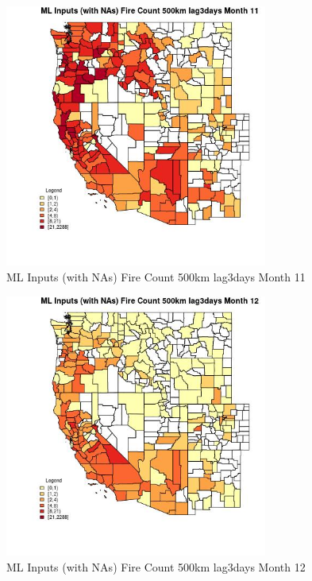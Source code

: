 \clearpage 

\begin{figure} 
\centering  
\includegraphics[width=0.77\textwidth]{Code_Outputs/Report_ML_input_PM25_Step4_part_e_de_duplicated_aves_compiled_2019-05-21wNAs_CountyFire_Count_500km_lag3daysmedianMonth11.jpg} 
\caption{\label{fig:Report_ML_input_PM25_Step4_part_e_de_duplicated_aves_compiled_2019-05-21wNAsCountyFire_Count_500km_lag3daysmedianMonth11}ML Inputs (with NAs) Fire Count 500km lag3days Month 11} 
\end{figure} 
 

\begin{figure} 
\centering  
\includegraphics[width=0.77\textwidth]{Code_Outputs/Report_ML_input_PM25_Step4_part_e_de_duplicated_aves_compiled_2019-05-21wNAs_CountyFire_Count_500km_lag3daysmedianMonth12.jpg} 
\caption{\label{fig:Report_ML_input_PM25_Step4_part_e_de_duplicated_aves_compiled_2019-05-21wNAsCountyFire_Count_500km_lag3daysmedianMonth12}ML Inputs (with NAs) Fire Count 500km lag3days Month 12} 
\end{figure} 
 

